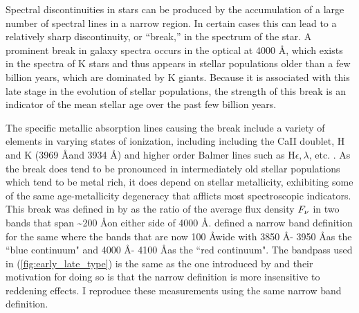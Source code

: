 Spectral discontinuities in stars can be 
produced by the accumulation of a large number 
of spectral lines in a narrow region. 
In certain cases this can lead to a relatively 
sharp discontinuity, or ``break,'' in  the 
spectrum of the star.  
A prominent break in galaxy spectra occurs in the
optical at 4000 
\AA \citep{bruzual1981, bruzual_a._spectral_1983}, 
which exists in the spectra of K stars and thus 
appears in stellar populations older than a few
billion years, which are dominated
by K giants. Because it is associated with this 
late stage in the evolution of stellar populations,
the strength of this break is an indicator of the 
mean stellar age over the past few billion years.

The specific metallic absorption lines causing the break 
include a variety of elements in varying states of 
ionization, including including the CaII doublet, H 
and K (3969 \AA and 3934 \AA) and higher order 
Balmer lines such as H$\epsilon, \lambda$, etc. 
\citep{hamilton1985}. As the break does tend to be pronounced in intermediately old stellar populations which tend to be metal rich, it does depend on stellar metallicity, exhibiting some of the same age-metallicity degeneracy that afflicts most spectroscopic indicators.\\ 



This break was defined in by \citet{bruzual_a._spectral_1983-2} as the ratio of the average flux density $F_{\rm \nu}$ in two bands that span \textasciitilde200 \AA on either side of 4000 \AA. \citet{1999ApJ...527...54B} defined a narrow band definition for the same where the bands that are now 100 \AA wide with 3850 \AA - 3950 \AA as the ``blue continuum" and 4000 \AA - 4100 \AA as the ``red continuum". The bandpass used in \citet{kauffmann_stellar_2003} (\ref{fig:early_late_type}) is the same as the one introduced by \citet{1999ApJ...527...54B} and their motivation for doing so is that the narrow definition is more insensitive to reddening effects. I reproduce these measurements using the same narrow band definition.\\

